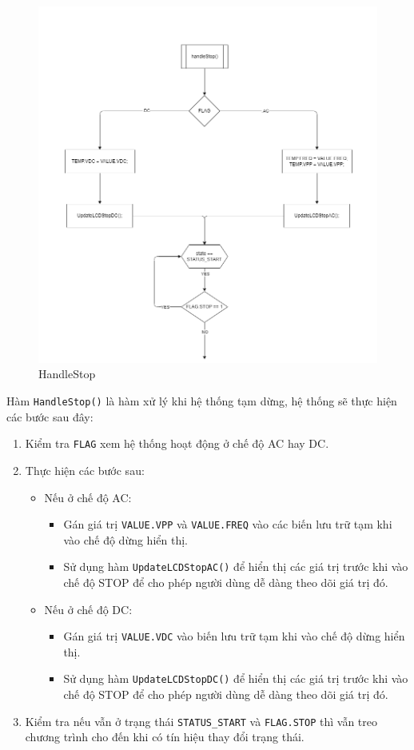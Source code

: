 \begin{figure}[H]
	\centering
	\includegraphics[width=\linewidth]{./diagram/handleStop.png}
	\caption{HandleStop}
	\label{f_handlestop}
\end{figure}

Hàm \texttt{HandleStop()} là hàm xử lý khi hệ thống tạm dừng, hệ thống sẽ thực hiện các bước sau đây:

\begin{enumerate}[label = Bước \arabic *:]
	\item Kiểm tra \texttt{FLAG} xem hệ thống hoạt động ở chế độ AC hay DC.
	\item Thực hiện các bước sau:
		\begin{itemize}[label = -]
			\item Nếu ở chế độ AC:
				\begin{itemize}[label = +]
					\item Gán giá trị \texttt{VALUE.VPP} và \texttt{VALUE.FREQ} vào các biến lưu trữ tạm khi vào chế độ dừng hiển thị.
					\item Sử dụng hàm \texttt{UpdateLCDStopAC()} để hiển thị các giá trị trước khi vào chế độ STOP để cho phép người dùng dễ dàng theo dõi giá trị đó.
				\end{itemize}
			\item Nếu ở chế độ DC:
				\begin{itemize}[label = +]
					\item Gán giá trị \texttt{VALUE.VDC} vào biến lưu trữ tạm khi vào chế độ dừng hiển thị.
					\item Sử dụng hàm \texttt{UpdateLCDStopDC()} để hiển thị các giá trị trước khi vào chế độ STOP để cho phép người dùng dễ dàng theo dõi giá trị đó.
				\end{itemize}
		\end{itemize}
	\item Kiểm tra nếu vẫn ở trạng thái \texttt{STATUS\_START} và \texttt{FLAG.STOP} thì vẫn treo chương trình cho đến khi có tín hiệu thay đổi trạng thái.
\end{enumerate}
